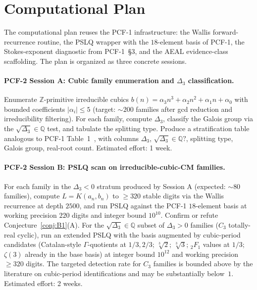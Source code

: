 \documentclass[11pt,a4paper]{article}
\theoremstyle{definition}
\theoremstyle{remark}
\newcommand{\Q}{\mathbb{Q}}
\newcommand{\Z}{\mathbb{Z}}
\begin{document}
\section{Computational Plan}\label{sec:plan}

The computational plan reuses the PCF-1 infrastructure: the Wallis
forward-recurrence routine, the PSLQ wrapper with the $18$-element basis
of PCF-1, the Stokes-exponent diagnostic from
PCF-1~\S 3, and the AEAL evidence-class scaffolding. The plan is
organized as three concrete sessions.

\paragraph{PCF-2 Session A: Cubic family enumeration and $\Delta_{3}$
classification.}
Enumerate $\Z$-primitive irreducible cubics $b(n)=\alpha_{3}n^{3}+\alpha_{2}n^{2}+\alpha_{1}n+\alpha_{0}$
with bounded coefficients $|\alpha_{i}|\le 5$ (target: $\sim 200$
families after gcd reduction and irreducibility filtering). For each
family, compute $\Delta_{3}$, classify the Galois group via the
$\sqrt{\Delta_{3}}\in\Q$ test, and tabulate the splitting type. Produce
a stratification table analogous to PCF-1
Table~1~\cite{Papanokechi2026PCF1}, with columns $\Delta_{3}$,
$\sqrt{\Delta_{3}}\in\Q?$, splitting type, Galois group, real-root count.
Estimated effort: 1 week.

\paragraph{PCF-2 Session B: PSLQ scan on irreducible-cubic-CM families.}
For each family in the $\Delta_{3}<0$ stratum produced by Session A
(expected: $\sim 80$ families), compute $L=K(a_{n},b_{n})$ to
$\ge 320$ stable digits via the Wallis recurrence at depth $2500$, and
run PSLQ against the PCF-1 $18$-element basis at working precision
$220$ digits and integer bound $10^{10}$. Confirm or refute
Conjecture~\ref{conj:B1}(A). For the $\sqrt{\Delta_{3}}\in\Q$ subset
of $\Delta_{3}>0$ families ($C_{3}$ totally-real cyclic),
run an extended PSLQ with the basis augmented by cubic-period
candidates (Catalan-style $\Gamma$-quotients at $1/3,2/3$;
$\sqrt[3]{2}$; $\sqrt[3]{3}$; ${}_{2}F_{1}$ values at $1/3$;
$\zeta(3)$ already in the base basis) at integer bound $10^{12}$ and
working precision $\ge 320$ digits. The targeted detection rate for
$C_{3}$ families is bounded above by the literature on cubic-period
identifications and may be substantially below~$1$. Estimated effort:
2 weeks.
\end{document}
